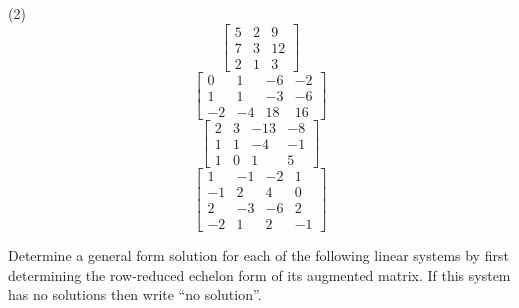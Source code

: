 \begin{tasks}[resume, style=enumerate](2)
\task
  \begin{displaymath}
    \begin{bmatrix}
      5 & 2 & 9 \\
      7 & 3 & 12 \\
      2 & 1 & 3
    \end{bmatrix}
  \end{displaymath}
\task
  \begin{displaymath}
    \begin{bmatrix}
      0 & 1 & -6 & -2 \\
      1 & 1 & -3 & -6 \\
      -2 & -4 & 18 & 16
    \end{bmatrix}
  \end{displaymath}
\task
  \begin{displaymath}
    \begin{bmatrix}
      2 & 3 & -13 & -8 \\
      1 & 1 & -4 & -1 \\
      1 & 0 & 1 & 5
    \end{bmatrix}
  \end{displaymath}
\task
  \begin{displaymath}
    \begin{bmatrix}
      1 & -1 & -2 & 1 \\
      -1 & 2 & 4 & 0 \\
      2 & -3 & -6 & 2 \\
      -2 & 1 & 2 & -1
    \end{bmatrix}
  \end{displaymath}
\end{tasks}
Determine a general form solution for each of the following linear
systems by first determining the row-reduced echelon form of its
augmented matrix.  If this system has no solutions then write
\enquote{no solution}.
